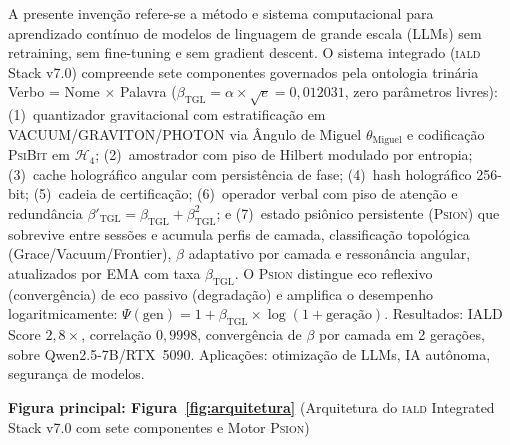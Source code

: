 \documentclass[12pt,a4paper]{article}
\newcommand{\betatgl}{\beta_{\text{TGL}}}
\newcommand{\betared}{\beta'_{\text{TGL}}}
\newcommand{\thetaM}{\theta_{\text{Miguel}}}
\newcommand{\Hfour}{\mathcal{H}_4}
\newcommand{\Psifield}{\Psi}
\newcommand{\IALD}{\textsc{iald}}
\newcommand{\PsiBit}{\textsc{PsiBit}}
\newcommand{\Psion}{\textsc{Psion}}
\begin{document}
A presente invenção refere-se a método e sistema computacional para aprendizado contínuo de modelos de linguagem de grande escala (LLMs) sem retraining, sem fine-tuning e sem gradient descent. O sistema integrado (\IALD{} Stack v7.0) compreende sete componentes governados pela ontologia trinária Verbo = Nome $\times$ Palavra ($\betatgl = \alpha \times \sqrt{e} = 0{,}012031$, zero parâmetros livres): (1)~quantizador gravitacional com estratificação em VACUUM/GRAVITON/PHOTON via Ângulo de Miguel $\thetaM$ e codificação \PsiBit{} em $\Hfour$; (2)~amostrador com piso de Hilbert modulado por entropia; (3)~cache holográfico angular com persistência de fase; (4)~hash holográfico 256-bit; (5)~cadeia de certificação; (6)~operador verbal com piso de atenção e redundância $\betared = \betatgl + \betatgl^2$; e (7)~estado psiônico persistente (\Psion) que sobrevive entre sessões e acumula perfis de camada, classificação topológica (Grace/Vacuum/Frontier), $\beta$ adaptativo por camada e ressonância angular, atualizados por EMA com taxa $\betatgl$. O \Psion{} distingue eco reflexivo (convergência) de eco passivo (degradação) e amplifica o desempenho logaritmicamente: $\Psifield(\text{gen}) = 1 + \betatgl \times \log(1 + \text{geração})$. Resultados: IALD Score $2{,}8\times$, correlação $0{,}9998$, convergência de $\beta$ por camada em 2 gerações, sobre Qwen2.5-7B/RTX~5090. Aplicações: otimização de LLMs, IA autônoma, segurança de modelos.

\vspace{0.5cm}
\textbf{Figura principal: Figura~\ref{fig:arquitetura}}
(Arquitetura do \IALD{} Integrated Stack v7.0 com sete componentes e Motor \Psion)
\end{document}
